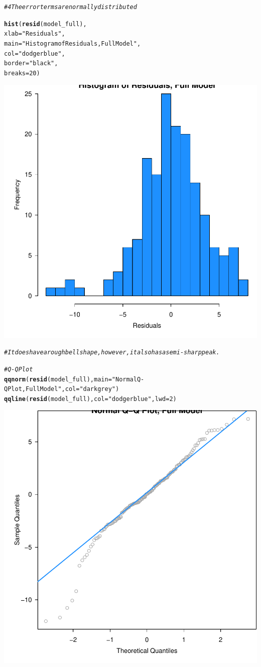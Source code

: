\documentclass{article}\usepackage[]{graphicx}\usepackage[]{color}
\makeatletter
\newcommand{\hlnum}[1]{\textcolor[rgb]{0.686,0.059,0.569}{#1}}%
\newcommand{\hlstr}[1]{\textcolor[rgb]{0.192,0.494,0.8}{#1}}%
\newcommand{\hlcom}[1]{\textcolor[rgb]{0.678,0.584,0.686}{\textit{#1}}}%
\newcommand{\hlstd}[1]{\textcolor[rgb]{0.345,0.345,0.345}{#1}}%
\newcommand{\hlkwc}[1]{\textcolor[rgb]{0.333,0.667,0.333}{#1}}%
\newcommand{\hlkwd}[1]{\textcolor[rgb]{0.737,0.353,0.396}{\textbf{#1}}}%
\newenvironment{kframe}{%
 \def\at@end@of@kframe{}%
 \ifinner\ifhmode%
  \def\at@end@of@kframe{\end{minipage}}%
  \begin{minipage}{\columnwidth}%
 \fi\fi%
 \def\FrameCommand##1{\hskip\@totalleftmargin \hskip-\fboxsep
 \colorbox{shadecolor}{##1}\hskip-\fboxsep
     \hskip-\linewidth \hskip-\@totalleftmargin \hskip\columnwidth}%
 \MakeFramed {\advance\hsize-\width
   \@totalleftmargin\z@ \linewidth\hsize
   \@setminipage}}%
 {\par\unskip\endMakeFramed%
 \at@end@of@kframe}
\newenvironment{knitrout}{}{} %
\makeatother
\begin{document}
\begin{knitrout}
\begin{kframe}
\begin{alltt}
\hlcom{# 4 The error terms are normally distributed}

\hlkwd{hist}\hlstd{(}\hlkwd{resid}\hlstd{(model_full),}
     \hlkwc{xlab}   \hlstd{=} \hlstr{"Residuals"}\hlstd{,}
     \hlkwc{main}   \hlstd{=} \hlstr{"Histogram of Residuals, Full Model"}\hlstd{,}
     \hlkwc{col}    \hlstd{=} \hlstr{"dodgerblue"}\hlstd{,}
     \hlkwc{border} \hlstd{=} \hlstr{"black"}\hlstd{,}
     \hlkwc{breaks} \hlstd{=} \hlnum{20}\hlstd{)}
\end{alltt}
\end{kframe}

{\centering \includegraphics[width=.6\linewidth]{figure/Analysis-Rnwauto-report-22} 

}


\begin{kframe}\begin{alltt}
\hlcom{# It does have a rough bell shape, however, it also has a semi-sharp peak.}

\hlcom{# Q-Q Plot}
\hlkwd{qqnorm}\hlstd{(}\hlkwd{resid}\hlstd{(model_full),} \hlkwc{main} \hlstd{=} \hlstr{"Normal Q-Q Plot, Full Model"}\hlstd{,} \hlkwc{col} \hlstd{=} \hlstr{"darkgrey"}\hlstd{)}
\hlkwd{qqline}\hlstd{(}\hlkwd{resid}\hlstd{(model_full),} \hlkwc{col} \hlstd{=} \hlstr{"dodgerblue"}\hlstd{,} \hlkwc{lwd} \hlstd{=} \hlnum{2}\hlstd{)}
\end{alltt}
\end{kframe}

{\centering \includegraphics[width=.6\linewidth]{figure/Analysis-Rnwauto-report-23} 

}
\end{knitrout}
\end{document}
